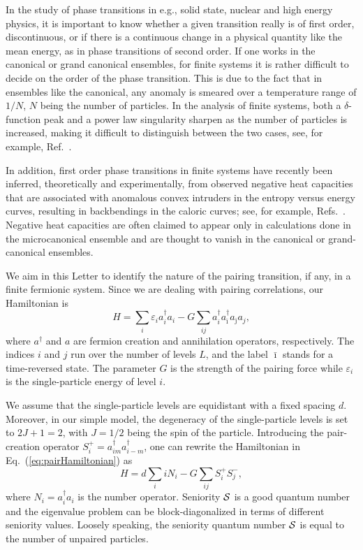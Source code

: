 \begin{multicols}{2}
In the study of phase transitions in e.g., solid state, nuclear and
high energy physics, it is important to know  whether
a given transition really is of first order, discontinuous, 
or if there is a continuous change
in a physical quantity like the mean energy, as in phase transitions
of second order. If one works in the canonical or grand canonical
ensembles, for finite systems
it is rather difficult to decide on the order of the phase
transition. This is due to the fact that in ensembles like the canonical,
any anomaly is smeared over a temperature range of $1/N$, $N$ being the
number of particles. In the analysis of  finite systems, both a 
$\delta$-function peak and a power law singularity sharpen as the
number of particles is increased, making it difficult to distinguish
between the two cases, see, for example, Ref.~\cite{huller}. 

In addition, first order phase transitions in finite systems 
have recently been inferred, theoretically and experimentally,  from 
observed negative heat capacities that 
are associated with anomalous convex intruders in the entropy
versus energy curves, resulting in backbendings in the caloric 
curves; see, for example, 
Refs.~\cite{andreas2000,huller,gross,schmidt01,agostino00,gc00}.
Negative heat capacities are often claimed to appear only in calculations
done in the microcanonical ensemble and are thought to vanish 
in the canonical or grand-canonical ensembles. 

We aim in this Letter to identify the nature of the pairing
transition, if any, in a finite fermionic system. 
Since we are dealing with pairing correlations, our 
Hamiltonian is 
\begin{equation}
   H=\sum_i \varepsilon_i a^{\dagger}_i a_i -G\sum_{ij}
           a^{\dagger}_{i}
     a^{\dagger}_{\bar{\imath}}a_{\bar{\jmath}}a_{j},
     \label{eq:pairHamiltonian}
\end{equation}
where $a^{\dagger}$ and $a$ are fermion creation and annihilation operators, 
respectively. The indices $i$ and $j$ run over the number 
of levels $L$, and the label $\bar{\imath}$ stands for a time-reversed state. 
The parameter $G$ is the strength of the pairing 
force while $\varepsilon_i$ is 
the single-particle energy of level $i$. 

We assume that the single-particle levels are equidistant with a 
fixed spacing $d$.
Moreover, in our simple model, the degeneracy of the single-particle 
levels is set to $2J+1=2$, with $J=1/2$ being the spin of the particle. 
Introducing the pair-creation operator 
$S^+_i=a^{\dagger}_{im}a^{\dagger}_{i-m}$,
one can rewrite the Hamiltonian in Eq.\ (\ref{eq:pairHamiltonian}) as
\begin{equation}
   H=d\sum_iiN_i
     -G\sum_{ij}S^+_iS^-_j,
     \label{eq:pair2}
\end{equation}
where  $N_i=a^{\dagger}_i a_i$
is the number operator.
Seniority $\cal{S}$ 
is a good quantum number and the eigenvalue problem 
can be block-diagonalized
in terms of different seniority values. Loosely speaking, 
the seniority quantum number $\cal{S}$ is equal to the number of 
unpaired particles.


\end{multicols}
